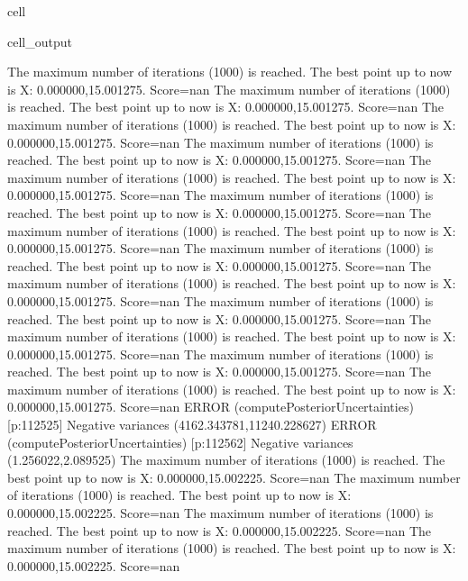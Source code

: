 \documentclass[letterpaper,10pt,english]{jupyterBook}
\begin{document}
\begin{sphinxuseclass}{cell}
\begin{sphinxVerbatimOutput}
\begin{sphinxuseclass}{cell_output}
\begin{sphinxVerbatim}[commandchars=\\\{\}]
The maximum number of iterations (1000) is reached. The best point up to now is X: \PYGZob{}0.000000,15.001275\PYGZcb{}. Score=\PYGZhy{}nan
The maximum number of iterations (1000) is reached. The best point up to now is X: \PYGZob{}0.000000,15.001275\PYGZcb{}. Score=\PYGZhy{}nan
The maximum number of iterations (1000) is reached. The best point up to now is X: \PYGZob{}0.000000,15.001275\PYGZcb{}. Score=\PYGZhy{}nan
The maximum number of iterations (1000) is reached. The best point up to now is X: \PYGZob{}0.000000,15.001275\PYGZcb{}. Score=\PYGZhy{}nan
The maximum number of iterations (1000) is reached. The best point up to now is X: \PYGZob{}0.000000,15.001275\PYGZcb{}. Score=\PYGZhy{}nan
The maximum number of iterations (1000) is reached. The best point up to now is X: \PYGZob{}0.000000,15.001275\PYGZcb{}. Score=\PYGZhy{}nan
The maximum number of iterations (1000) is reached. The best point up to now is X: \PYGZob{}0.000000,15.001275\PYGZcb{}. Score=\PYGZhy{}nan
The maximum number of iterations (1000) is reached. The best point up to now is X: \PYGZob{}0.000000,15.001275\PYGZcb{}. Score=\PYGZhy{}nan
The maximum number of iterations (1000) is reached. The best point up to now is X: \PYGZob{}0.000000,15.001275\PYGZcb{}. Score=\PYGZhy{}nan
The maximum number of iterations (1000) is reached. The best point up to now is X: \PYGZob{}0.000000,15.001275\PYGZcb{}. Score=\PYGZhy{}nan
The maximum number of iterations (1000) is reached. The best point up to now is X: \PYGZob{}0.000000,15.001275\PYGZcb{}. Score=\PYGZhy{}nan
The maximum number of iterations (1000) is reached. The best point up to now is X: \PYGZob{}0.000000,15.001275\PYGZcb{}. Score=\PYGZhy{}nan
The maximum number of iterations (1000) is reached. The best point up to now is X: \PYGZob{}0.000000,15.001275\PYGZcb{}. Score=\PYGZhy{}nan
ERROR (compute\PYGZus{}Posterior\PYGZus{}Uncertainties) [p:112525] Negative variances (4162.343781,\PYGZhy{}11240.228627)
ERROR (compute\PYGZus{}Posterior\PYGZus{}Uncertainties) [p:112562] Negative variances (1.256022,\PYGZhy{}2.089525)
The maximum number of iterations (1000) is reached. The best point up to now is X: \PYGZob{}0.000000,15.002225\PYGZcb{}. Score=\PYGZhy{}nan
The maximum number of iterations (1000) is reached. The best point up to now is X: \PYGZob{}0.000000,15.002225\PYGZcb{}. Score=\PYGZhy{}nan
The maximum number of iterations (1000) is reached. The best point up to now is X: \PYGZob{}0.000000,15.002225\PYGZcb{}. Score=\PYGZhy{}nan
The maximum number of iterations (1000) is reached. The best point up to now is X: \PYGZob{}0.000000,15.002225\PYGZcb{}. Score=\PYGZhy{}nan

\end{sphinxVerbatim}
\end{sphinxuseclass}
\end{sphinxVerbatimOutput}
\end{sphinxuseclass}
\end{document}
